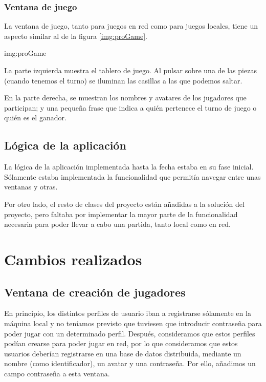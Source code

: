 
\subsubsection{Ventana de juego}
La ventana de juego, tanto para juegos en red como para juegos locales, tiene
un aspecto similar al de la figura \ref{img:proGame}.

{img:proGame}

La parte izquierda muestra el tablero de juego. Al pulsar sobre una de las piezas 
(cuando tenemos el turno) se iluminan las casillas a las que podemos saltar.

En la parte derecha, se muestran los nombres y avatares de los jugadores que 
participan; y una pequeña frase que indica a quién pertenece el turno de juego o 
quién es el ganador.

\subsection{Lógica de la aplicación}
La lógica de la aplicación implementada hasta la fecha estaba en su fase
inicial. Sólamente estaba implementada la funcionalidad que permitía
navegar entre unas ventanas y otras.

Por otro lado, el resto de clases del proyecto están añadidas a la solución
del proyecto, pero faltaba por implementar la mayor parte de la funcionalidad 
necesaria para poder llevar a cabo una partida, tanto local como en red.

\section{Cambios realizados}
\subsection{Ventana de creación de jugadores}
En principio, los distintos perfiles de usuario iban a registrarse sólamente
en la máquina local y no teníamos previsto que tuviesen que introducir
contraseña para poder jugar con un determinado perfil. Después, consideramos
que estos perfiles podían crearse para poder jugar en red, por lo que
consideramos que estos usuarios deberían registrarse en una base de datos
distribuida, mediante un nombre (como identificador), un avatar y una
contraseña. Por ello, añadimos un campo contraseña a esta ventana.


